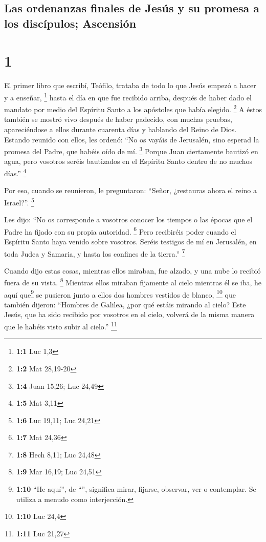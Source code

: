 \hypertarget{las-ordenanzas-finales-de-jesuxfas-y-su-promesa-a-los-discuxedpulos-ascensiuxf3n}{%
\subsection{Las ordenanzas finales de Jesús y su promesa a los
discípulos;
Ascensión}\label{las-ordenanzas-finales-de-jesuxfas-y-su-promesa-a-los-discuxedpulos-ascensiuxf3n}}

\hypertarget{section}{%
\section{1}\label{section}}

 El primer libro que escribí, Teófilo, trataba de todo lo
que Jesús empezó a hacer y a enseñar, \footnote{\textbf{1:1} Luc 1,3}
 hasta el día en que fue recibido arriba, después de haber
dado el mandato por medio del Espíritu Santo a los apóstoles que había
elegido. \footnote{\textbf{1:2} Mat 28,19-20}  A éstos
también se mostró vivo después de haber padecido, con muchas pruebas,
apareciéndose a ellos durante cuarenta días y hablando del Reino de
Dios.  Estando reunido con ellos, les ordenó: ``No os
vayáis de Jerusalén, sino esperad la promesa del Padre, que habéis oído
de mí. \footnote{\textbf{1:4} Juan 15,26; Luc 24,49} 
Porque Juan ciertamente bautizó en agua, pero vosotros seréis bautizados
en el Espíritu Santo dentro de no muchos días.'' \footnote{\textbf{1:5}
  Mat 3,11}

 Por eso, cuando se reunieron, le preguntaron: ``Señor,
¿restauras ahora el reino a Israel?''. \footnote{\textbf{1:6} Luc 19,11;
  Luc 24,21}

 Les dijo: ``No os corresponde a vosotros conocer los
tiempos o las épocas que el Padre ha fijado con su propia autoridad.
\footnote{\textbf{1:7} Mat 24,36}  Pero recibiréis poder
cuando el Espíritu Santo haya venido sobre vosotros. Seréis testigos de
mí en Jerusalén, en toda Judea y Samaria, y hasta los confines de la
tierra.'' \footnote{\textbf{1:8} Hech 8,11; Luc 24,48}

 Cuando dijo estas cosas, mientras ellos miraban, fue
alzado, y una nube lo recibió fuera de su vista. \footnote{\textbf{1:9}
  Mar 16,19; Luc 24,51}  Mientras ellos miraban fijamente
al cielo mientras él se iba, he aquí que\footnote{\textbf{1:10} ``He
  aquí'', de ``'', significa mirar, fijarse, observar, ver o
  contemplar. Se utiliza a menudo como interjección.} se pusieron junto
a ellos dos hombres vestidos de blanco, \footnote{\textbf{1:10} Luc 24,4}
 que también dijeron: ``Hombres de Galilea, ¿por qué
estáis mirando al cielo? Este Jesús, que ha sido recibido por vosotros
en el cielo, volverá de la misma manera que le habéis visto subir al
cielo.'' \footnote{\textbf{1:11} Luc 21,27}

